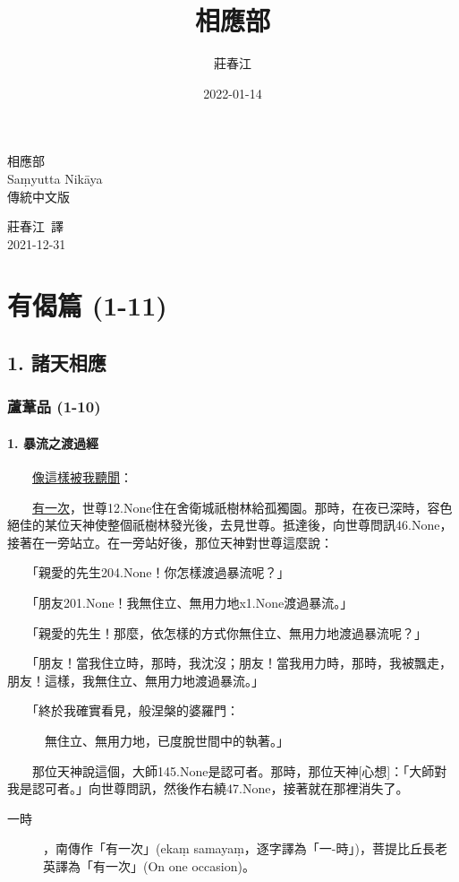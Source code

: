 \documentclass[a4paper,12pt,oneside]{book}
\title{相應部}
\author{莊春江}
\date{2022-01-14}
\makeatletter
\newcommand{\linkdest}[1]{\Hy@raisedlink{\hypertarget{#1}{}}}
\newcommand{\HRule}{\rule{\linewidth}{0.5mm}}
\newenvironment{EvnNote}{\begin{description}}{\end{description}}
\newcommand{\subnote}[4]{\item[{\textit#2}#3]\linkdest{#1}#4}
\newcommand{\twnr}[2]{\hyperlink{#2}{#1}}
\makeatother
\begin{document}
\begin{titlepage}
\begin{center}
\null \vspace{2cm}
{\fontsize{130}{140}\selectfont \jfontCoverTitle 相應部}
\\[0.5cm]
{\fontsize{45}{55}\selectfont \fontCoverTitle Saṃyutta Nikāya}
\\[1.5cm]

{\Huge 傳統中文版}
\\ \vspace{0.5em}

\vfill

{\Large 莊春江\ 譯}
\\ \vspace{0.5em}
{\Large 2021-12-31}

\end{center}
\end{titlepage}

\part{有偈篇 (1-11)}
\chapter{1. 諸天相應}
\section{蘆葦品 (1-10)}
\subsection{1. 暴流之渡過經}
\label{subsec:SN.1.1}
　　\twnr{像這樣被我聽聞}{1.None}：

　　\twnr{有一次}{2.None}，{世尊}{12.None}住在舍衛城祇樹林給孤獨園。那時，在夜已深時，容色絕佳的某位天神使整個祇樹林發光後，去見世尊。抵達後，向世尊{問訊}{46.None}，接著在一旁站立。在一旁站好後，那位天神對世尊這麼說：

　　「{親愛的先生}{204.None}！你怎樣渡過暴流呢？」

　　「{朋友}{201.None}！我無住立、{無用力地}{x1.None}渡過暴流。」

　　「親愛的先生！那麼，依怎樣的方式你無住立、無用力地渡過暴流呢？」

　　「朋友！當我住立時，那時，我沈沒；朋友！當我用力時，那時，我被飄走，朋友！這樣，我無住立、無用力地渡過暴流。」

　　「終於我確實看見，般涅槃的婆羅門：

　　　無住立、無用力地，已度脫世間中的執著。」

　　那位天神說這個，{大師}{145.None}是認可者。那時，那位天神{[}心想{]}：「大師對我是認可者。」向世尊問訊，然後{作右繞}{47.None}，接著就在那裡消失了。


\begin{EvnNote}
	\subnote{2.None}{\null}{一時}{，南傳作「有一次」(ekaṃ samayaṃ，逐字譯為「一-時」)，菩提比丘長老英譯為「有一次」(On one occasion)。}
\end{EvnNote}

\clearpage
\end{document}
